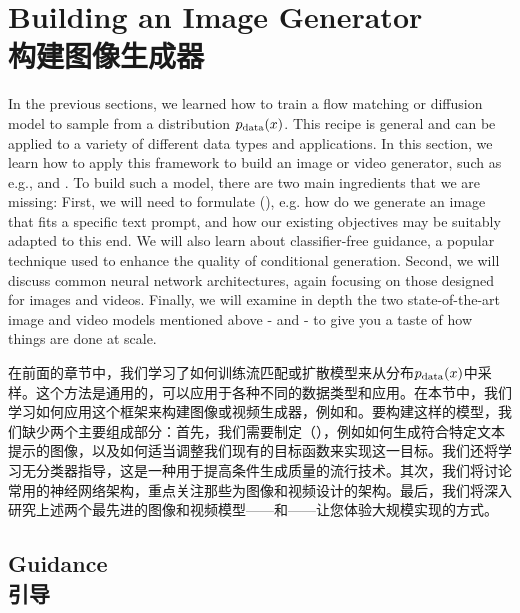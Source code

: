 \section{Building an Image Generator\\构建图像生成器}
\label{sec:image_generation}

In the previous sections, we learned how to train a flow matching or diffusion model to sample from a distribution $p_{\rm{data}}(x)$. This recipe is general and can be applied to a variety of different data types and applications. In this section, we learn how to apply this framework to build an image or video generator, such as e.g.,  and . To build such a model, there are two main ingredients that we are missing: First, we will need to formulate  (), e.g. how do we generate an image that fits a specific text prompt, and how our existing objectives may be suitably adapted to this end. We will also learn about classifier-free guidance, a popular technique used to enhance the quality of conditional generation. Second, we will discuss common neural network architectures, again focusing on those designed for images and videos. Finally, we will examine in depth the two state-of-the-art image and video models mentioned above -  and  - to give you a taste of how things are done at scale.

在前面的章节中，我们学习了如何训练流匹配或扩散模型来从分布$p_{\rm{data}}(x)$中采样。这个方法是通用的，可以应用于各种不同的数据类型和应用。在本节中，我们学习如何应用这个框架来构建图像或视频生成器，例如和。要构建这样的模型，我们缺少两个主要组成部分：首先，我们需要制定（），例如如何生成符合特定文本提示的图像，以及如何适当调整我们现有的目标函数来实现这一目标。我们还将学习无分类器指导，这是一种用于提高条件生成质量的流行技术。其次，我们将讨论常用的神经网络架构，重点关注那些为图像和视频设计的架构。最后，我们将深入研究上述两个最先进的图像和视频模型——和——让您体验大规模实现的方式。

\subsection{Guidance\\引导}

